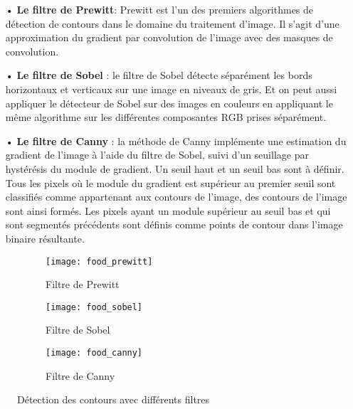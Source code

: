     \begin{itemize}
        \item[•]\textbf{Le filtre de Prewitt}: Prewitt est l'un des premiers algorithmes de détection de contours dans le domaine du traitement d'image.
        Il s'agit d'une approximation du gradient par convolution de l'image avec des masques de convolution.
        \item[•]\textbf{Le filtre de Sobel} : le filtre de Sobel détecte séparément les bords horizontaux et verticaux sur une image en niveaux de gris. Et on peut aussi appliquer le détecteur de Sobel sur des images en couleurs en appliquant le même
        algorithme sur les différentes composantes RGB prises séparément.
        \item[•]\textbf{Le filtre de Canny} : la méthode de Canny implémente une estimation du gradient de l'image à l'aide du filtre de Sobel, suivi
        d'un seuillage par hystérésis du module de gradient. Un seuil haut et un seuil bas sont à définir.
        Tous les pixels où le module du gradient est supérieur au premier seuil sont classifiés comme appartenant
        aux contours de l'image, des contours de l'image sont ainsi formés. Les pixels ayant un module supérieur
        au seuil bas et qui sont segmentés précédents sont définis comme points de contour dans l'image binaire
        résultante.\cite{akacemMaster}
    \end{itemize}
    \begin{figure}[H]
        \begin{subfigure}{0.3\textwidth}
            \centering
            \texttt{[image: food\_prewitt]}
            \caption{Filtre de Prewitt}
        \end{subfigure}
        \hfill
        \begin{subfigure}{0.3\textwidth}
            \centering
            \texttt{[image: food\_sobel]}
            \caption{Filtre de Sobel}
        \end{subfigure}
        \hfill
        \begin{subfigure}{0.3\textwidth}
            \centering
            \texttt{[image: food\_canny]}
            \caption{Filtre de Canny}
        \end{subfigure}
        \caption{Détection des contours avec différents filtres}
    \end{figure}

